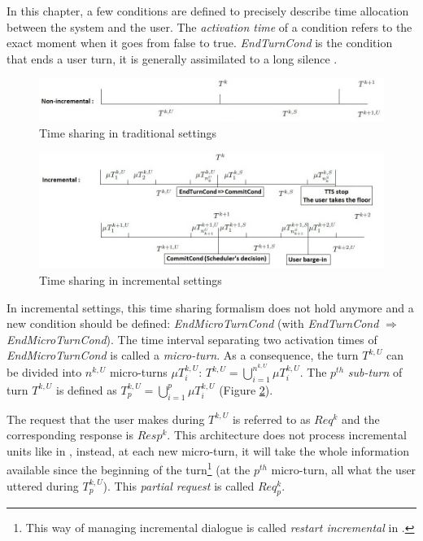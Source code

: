         In this chapter, a few conditions are defined to precisely describe time allocation between the system and the user. The \textit{activation time} of a condition refers to the exact moment when it goes from false to true. \textit{EndTurnCond} is the condition that ends a user turn, it is generally assimilated to a long silence \cite{Raux2008,Wlodarczak2013}.
        
        \begin{figure}[t]
          \centering
          \includegraphics[scale=0.6]{figures/TraditionalTimeline.jpg}
          \caption{Time sharing in traditional settings}
          \label{fig:tradtimeshare}
        \end{figure}

        \begin{figure}[t]
          \centering
          \includegraphics[scale=0.6]{figures/IncrementalTimeline.jpg}
          \caption{Time sharing in incremental settings}
          \label{fig:incrtimeshare}
        \end{figure}
        
        In incremental settings, this time sharing formalism does not hold anymore and a new condition should be defined: \textit{EndMicroTurnCond} (with \textit{EndTurnCond} $\Rightarrow$ \textit{EndMicroTurnCond}). The time interval separating two activation times of \textit{EndMicroTurnCond} is called a \textit{micro-turn}. As a consequence, the turn $T^{k,U}$ can be divided into $n^{k,U}$ micro-turns $\mu T^{k,U}_i$: $T^{k,U} = \bigcup_{i=1}^{n^{k,U}} \mu T^{k,U}_i$. The $p^{th}$ \textit{sub-turn} of turn $T^{k,U}$ is defined as $T^{k,U}_p = \bigcup_{i=1}^p \mu T^{k,U}_i$ (Figure \ref{fig:incrtimeshare}).
        
        The request that the user makes during $T^{k,U}$ is referred to as $Req^k$ and the corresponding response is $Resp^k$. This architecture does not process incremental units like in \cite{Schlangen2011}, instead, at each new micro-turn, it will take the whole information available since the beginning of the turn\footnote{This way of managing incremental dialogue is called \textit{restart incremental} in \cite{Schlangen2011}.} (at the $p^{th}$ micro-turn, all what the user uttered during $T^{k,U}_p$). This \textit{partial request} is called $Req^k_p$.
        
